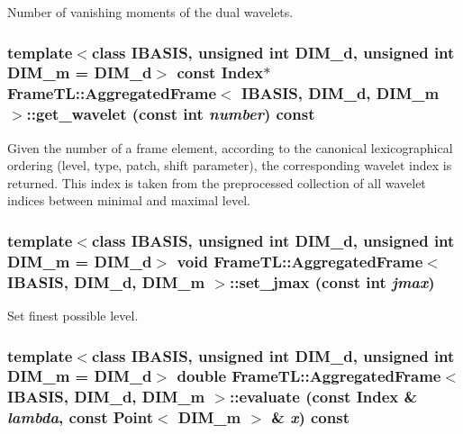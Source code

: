 Number of vanishing moments of the dual wavelets. \hypertarget{classFrameTL_1_1AggregatedFrame_4bbcc2a56f2c07a745b9b937109b5fde}{
\subsubsection[get\_\-wavelet]{\setlength{\rightskip}{0pt plus 5cm}template$<$class IBASIS, unsigned int DIM\_\-d, unsigned int DIM\_\-m = DIM\_\-d$>$ const {\bf Index}$\ast$ {\bf FrameTL::AggregatedFrame}$<$ IBASIS, DIM\_\-d, DIM\_\-m $>$::get\_\-wavelet (const int {\em number}) const}}
\label{classFrameTL_1_1AggregatedFrame_4bbcc2a56f2c07a745b9b937109b5fde}


Given the number of a frame element, according to the canonical lexicographical ordering (level, type, patch, shift parameter), the corresponding wavelet index is returned. This index is taken from the preprocessed collection of all wavelet indices between minimal and maximal level. \hypertarget{classFrameTL_1_1AggregatedFrame_d27b0ed0194ad64fcc7c804c9027de33}{
\subsubsection[set\_\-jmax]{\setlength{\rightskip}{0pt plus 5cm}template$<$class IBASIS, unsigned int DIM\_\-d, unsigned int DIM\_\-m = DIM\_\-d$>$ void {\bf FrameTL::AggregatedFrame}$<$ IBASIS, DIM\_\-d, DIM\_\-m $>$::set\_\-jmax (const int {\em jmax})}}
\label{classFrameTL_1_1AggregatedFrame_d27b0ed0194ad64fcc7c804c9027de33}


Set finest possible level. \hypertarget{classFrameTL_1_1AggregatedFrame_0583fb8cb8deeefc8884c8c4dfb5d25b}{
\subsubsection[evaluate]{\setlength{\rightskip}{0pt plus 5cm}template$<$class IBASIS, unsigned int DIM\_\-d, unsigned int DIM\_\-m = DIM\_\-d$>$ double {\bf FrameTL::AggregatedFrame}$<$ IBASIS, DIM\_\-d, DIM\_\-m $>$::evaluate (const {\bf Index} \& {\em lambda}, \/  const Point$<$ DIM\_\-m $>$ \& {\em x}) const}}
\label{classFrameTL_1_1AggregatedFrame_0583fb8cb8deeefc8884c8c4dfb5d25b}


